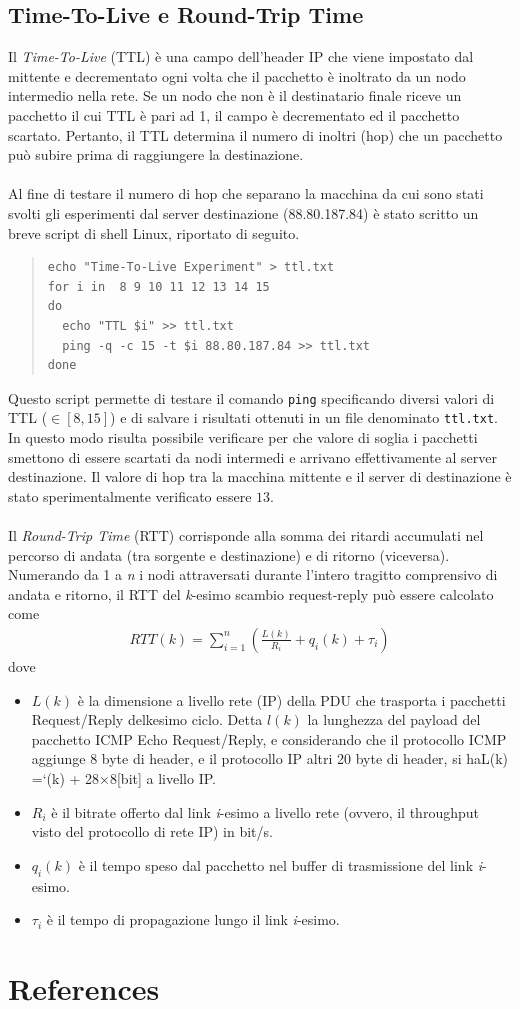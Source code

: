 \documentclass[a4paper,10pt]{article}
\begin{document}
\newpage
\subsection{Time-To-Live e Round-Trip Time}
Il \textit{Time-To-Live} (TTL) è una campo dell'header IP che viene impostato dal mittente e decrementato ogni volta che il pacchetto è inoltrato da un nodo intermedio nella rete. Se un nodo che non è il destinatario finale riceve un pacchetto il cui TTL è pari ad 1, il campo è decrementato ed il pacchetto scartato. Pertanto, il TTL determina il numero di inoltri (hop) che un pacchetto può subire prima di raggiungere la destinazione.\\\\
Al fine di testare il numero di hop che separano la macchina da cui sono stati svolti gli esperimenti dal server destinazione (88.80.187.84) è stato scritto un breve script di shell Linux, riportato di seguito.
\begin{quote}
\begin{verbatim}
echo "Time-To-Live Experiment" > ttl.txt
for i in  8 9 10 11 12 13 14 15 
do
  echo "TTL $i" >> ttl.txt
  ping -q -c 15 -t $i 88.80.187.84 >> ttl.txt
done
\end{verbatim}
\end{quote}
Questo script permette di testare il comando \texttt{ping} specificando diversi valori di TTL ($\in[8, 15]$) e di salvare i risultati ottenuti in un file denominato \texttt{ttl.txt}. In questo modo risulta possibile verificare per che valore di soglia i pacchetti smettono di essere scartati da nodi intermedi e arrivano effettivamente al server destinazione. Il valore di hop tra la macchina mittente e il server di destinazione è stato sperimentalmente verificato essere \textbf{$13$}.\\\\
Il \textit{Round-Trip Time} (RTT) corrisponde alla somma dei ritardi accumulati nel percorso di andata (tra sorgente e destinazione) e di ritorno (viceversa). Numerando da 1 a \textit{n} i nodi attraversati durante l'intero tragitto comprensivo di andata e ritorno, il RTT del \textit{k}-esimo scambio request-reply può essere calcolato come
\begin{align*}
RTT(k) = \sum_{i=1}^{n} \left( \frac{L(k)}{R_i} + q_i(k) + \tau_i \right)
\end{align*}
dove
\begin{itemize}
\item $L(k)$ è la dimensione a livello rete (IP) della PDU che trasporta i pacchetti Request/Reply delkesimo ciclo.  Detta $l(k)$ la lunghezza del payload del pacchetto ICMP Echo Request/Reply, e considerando che il protocollo ICMP aggiunge 8 byte di header, e il protocollo IP altri 20 byte di header, si haL(k) =`(k) + 28×8[bit] a livello IP.
\item $R_i$ è il bitrate offerto dal link \textit{i}-esimo a livello rete (ovvero, il throughput visto del protocollo di rete IP) in bit/s.
\item $q_i(k)$ è il tempo speso dal pacchetto nel buffer di trasmissione del link \textit{i}-esimo.
\item $\tau_i$ è il tempo di propagazione lungo il link \textit{i}-esimo.
\end{itemize}

\newpage

\section{References}
\printbibliography[heading=none]
\end{document}
